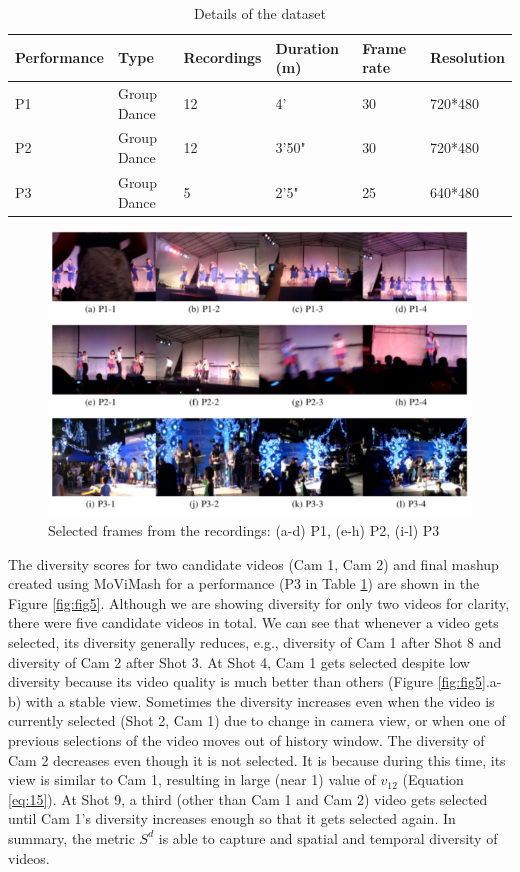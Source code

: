 \documentclass{sig-alternate}
\begin{document}
\begin{table}
\fontsize{8}{8}\selectfont
\caption{Details of the dataset}
\label{table2}
\begin{tabular}{m{1cm}|p{0.8cm}|p{0.8cm}|p{0.8cm}|p{0.8cm}|p{1.5cm}}
\hline
Performance & Type & Recordings & Duration (m) & Frame rate  & Resolution\\
\hline
P1 & Group Dance &  12 & 4'  & 30  & 720*480\\
\hline
P2 & Group Dance &  12 & 3'50"  & 30  & 720*480\\
\hline
P3 & Group Dance &  5 & 2'5"  & 25  & 640*480\\
\hline
\end{tabular}
\end{table}

\begin{figure}
    \centering
    \includegraphics{img6.png}
    \caption{Selected frames from the recordings: (a-d) P1, (e-h) P2, (i-l) P3}
    \label{fig:fig6}
\end{figure}


The diversity scores for two candidate videos (Cam 1, Cam 2)
and final mashup created using MoViMash for a performance (P3
in Table \ref{table2}) are shown in the Figure \ref{fig:fig5}. Although we are showing diversity for only two videos for clarity, there were five candidate videos in total. We can see that whenever a video gets selected, its diversity generally reduces, e.g., diversity of Cam 1 after Shot 8 and diversity of Cam 2 after Shot 3. At Shot 4, Cam 1 gets selected despite low diversity because its video quality is much better than others (Figure \ref{fig:fig5}.a-b) with a stable view. Sometimes the diversity increases even when the video is currently selected (Shot 2, Cam 1) due to change in camera view, or when one of previous selections of the video moves out of history window. The diversity of Cam 2 decreases even though it is not selected. It is because during this time, its view is similar to Cam 1, resulting in large (near 1) value of $v_{12}$ (Equation \ref{eq:15}). At Shot 9, a third (other than Cam 1 and Cam 2) video gets selected until Cam 1's diversity increases enough so that it gets selected again. In summary, the metric $S^d$ is able to capture and spatial and temporal diversity of videos.
\end{document}
